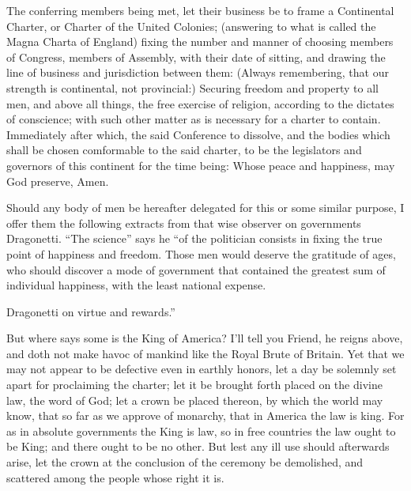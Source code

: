 \documentclass[12pt,oneside]{memoir}
\begin{document}
The conferring members being met, let their business be to frame a Continental Charter, or Charter of the United Colonies; (answering to what is called the Magna Charta of England) fixing the number and manner of choosing members of Congress, members of Assembly, with their date of sitting, and drawing the line of business and 
jurisdiction between them: (Always remembering, that our strength is continental, not provincial:) Securing freedom and property to all men, and above all things, the free exercise of religion, according to the dictates of conscience; with such other matter as is necessary for a charter to contain. Immediately after which, the said Conference to dissolve, and the bodies which shall be chosen comformable to the said charter, to be the legislators and governors of this continent for the time being: Whose peace and happiness, may God preserve, Amen.

Should any body of men be hereafter delegated for this or some similar purpose, I offer them the following extracts from that wise observer on governments Dragonetti. ``The science'' says he ``of the politician consists in fixing the true point of happiness and freedom. Those men would deserve the gratitude of ages, who should discover a mode of government that contained the greatest sum of individual happiness, with the least national expense.

Dragonetti on virtue and rewards.''

But where says some is the King of America? I'll tell you Friend, he reigns above, and doth not make havoc of mankind like the Royal Brute of Britain. Yet that we may not appear to be defective even in earthly honors, let a day be solemnly set apart for proclaiming the charter; let it be brought forth placed on the divine law, the word of God; let a crown be placed thereon, by which the world may know, that so far as we approve of monarchy, that in America the law is king. For as in absolute governments the King is law, so in free countries the law ought to be King; and there ought to be no other. But lest any ill use should afterwards arise, let the crown at the conclusion of the ceremony be demolished, and scattered among the people whose right it is.
\end{document}
